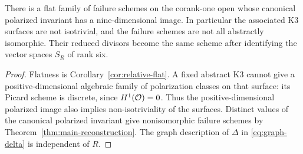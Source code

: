 \begin{corollary}\label{cor:nonisotrivial}
There is a flat family of failure schemes on the corank-one open whose
canonical polarized invariant has a nine-dimensional image. In
particular the associated K3 surfaces are not isotrivial, and the
failure schemes are not all abstractly isomorphic. Their reduced
divisors become the same scheme after identifying the vector spaces
$S_R$ of rank six.
\end{corollary}
\begin{proof}
Flatness is Corollary~\ref{cor:relative-flat}. A fixed abstract K3
cannot give a positive-dimensional algebraic family of polarization
classes on that surface: its Picard scheme is discrete, since
$H^1(\mathcal O)=0$. Thus the positive-dimensional polarized image also
implies non-isotriviality of the surfaces. Distinct values of the
canonical polarized invariant give nonisomorphic failure schemes by
Theorem~\ref{thm:main-reconstruction}. The graph description of
$\Delta$ in \eqref{eq:graph-delta} is independent of $R$.
\end{proof}
